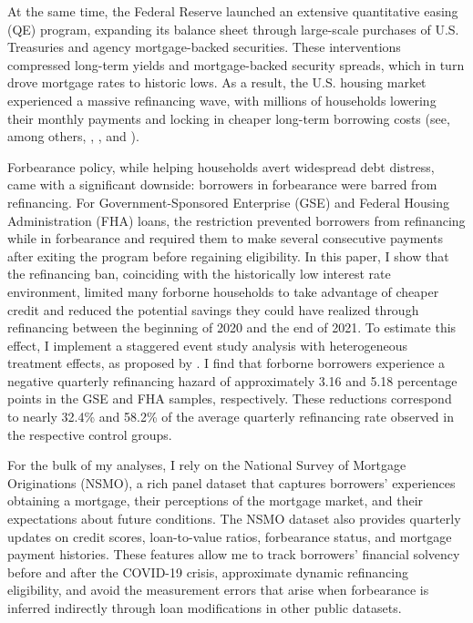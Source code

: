 \documentclass[11pt]{article}
\begin{document}
At the same time, the Federal Reserve launched an extensive quantitative easing (QE) program, expanding its balance sheet through large-scale purchases of U.S. Treasuries and agency mortgage-backed securities. These interventions compressed long-term yields and mortgage-backed security spreads, which in turn drove mortgage rates to historic lows. As a result, the U.S. housing market experienced a massive refinancing wave, with millions of households lowering their monthly payments and locking in cheaper long-term borrowing costs (see, among others, \citet{gerardi2021racial}, \citet{fuster2021resilient}, and \citet{agarwal2024refinancing}). 

Forbearance policy, while helping households avert widespread debt distress, came with a significant downside: borrowers in forbearance were barred from refinancing. For Government-Sponsored Enterprise (GSE) and Federal Housing Administration (FHA) loans, the restriction prevented borrowers from refinancing while in forbearance and required them to make several consecutive payments after exiting the program before regaining eligibility. In this paper, I show that the refinancing ban, coinciding with the historically low interest rate environment, limited many forborne households to take advantage of cheaper credit and reduced the potential savings they could have realized through refinancing between the beginning of 2020 and the end of 2021. To estimate this effect, I implement a staggered event study analysis with heterogeneous treatment effects, as proposed by \citet{sunAbraham2021}. I find that forborne borrowers experience a negative quarterly refinancing hazard of approximately 3.16 and 5.18 percentage points in the GSE and FHA samples, respectively. These reductions correspond to nearly 32.4\% and 58.2\% of the average quarterly refinancing rate observed in the respective control groups. 

For the bulk of my analyses, I rely on the National Survey of Mortgage Originations (NSMO), a rich panel dataset that captures borrowers’ experiences obtaining a mortgage, their perceptions of the mortgage market, and their expectations about future conditions. The NSMO dataset also provides quarterly updates on credit scores, loan-to-value ratios, forbearance status, and mortgage payment histories. These features allow me to track borrowers’ financial solvency before and after the COVID-19 crisis, approximate dynamic refinancing eligibility, and avoid the measurement errors that arise when forbearance is inferred indirectly through loan modifications in other public datasets.
\end{document}
